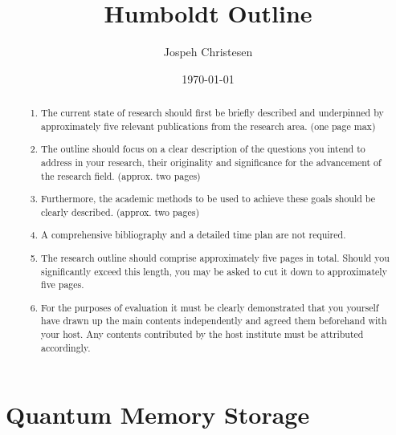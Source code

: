 \documentclass[a4paper]{article}
\title{Humboldt Outline}
\author{Jospeh Christesen}
\date{\today}
\begin{document}
\maketitle

\begin{abstract}
\noindent
\begin{enumerate}
\item The current state of research should first be briefly described and underpinned by approximately five relevant publications from the research area. (one page max)  

\item The outline should focus on a clear description of the questions you intend to address in your research, their originality and significance for the advancement of the research field. (approx. two pages) 

\item Furthermore, the academic methods to be used to achieve these goals should be clearly described. (approx. two pages)

\item A comprehensive bibliography and a detailed time plan are not required. 

\item The research outline should comprise approximately five pages in total. Should you significantly exceed this length, you may be asked to cut it down to approximately five pages.

\item For the purposes of evaluation it must be clearly demonstrated that you yourself have drawn up the main contents independently and agreed them beforehand with your host. Any contents contributed by the host institute must be attributed accordingly.
\end{enumerate}
\end{abstract}

\section{Quantum Memory Storage}
\end{document}
